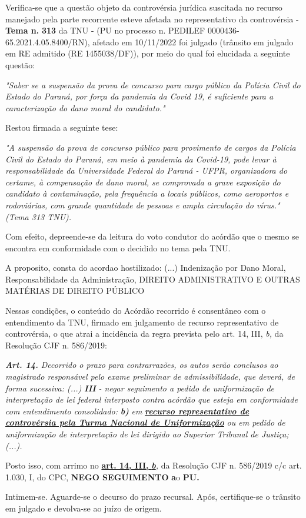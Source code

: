 \documentclass[12pt]{article}
\begin{document}
\justifying
\noindent Verifica-se que a questão objeto da controvérsia jurídica suscitada no recurso manejado pela parte recorrente esteve afetada no representativo da controvérsia - \textbf{Tema n. }\textbf{313} da TNU - (PU no processo n. PEDILEF 0000436-65.2021.4.05.8400/RN),  afetado em 10/11/2022 foi julgado (trânsito em julgado em RE admitido (RE 1455038/DF)), por meio do qual foi elucidada a seguinte questão:

\noindent \textit{"Saber se a suspensão da prova de concurso para cargo público da Polícia Civil do Estado do Paraná, por força da pandemia da Covid 19, é suficiente para a caracterização do dano moral do candidato."}

\noindent Restou firmada a seguinte tese:

\noindent \textit{"A suspensão da prova de concurso público para provimento de cargos da Polícia Civil do Estado do Paraná, em meio à pandemia da Covid-19, pode levar à responsabilidade da Universidade Federal do Paraná - UFPR, organizadora do certame, à compensação de dano moral, se comprovada a grave exposição do candidato à contaminação, pela frequência a locais públicos, como aeroportos e rodoviárias, com grande quantidade de pessoas e ampla circulação do vírus." (Tema 313 TNU).}

\noindent Com efeito, depreende-se da leitura do voto condutor do acórdão que o mesmo se encontra em conformidade com o decidido no  tema pela TNU.

\noindent A proposito, consta do acordao hostilizado: (...) Indenização por Dano Moral, Responsabilidade da Administração, DIREITO ADMINISTRATIVO E OUTRAS MATÉRIAS DE DIREITO PÚBLICO

\noindent Nessas condições, o conteúdo do Acórdão recorrido é consentâneo com o entendimento da TNU, firmado em julgamento de recurso representativo de controvérsia, o que atrai a incidência da regra prevista pelo art. 14, III, \textit{b,} da Resolução CJF n. 586/2019:

\noindent \textit{\textbf{Art. 14.}}\textit{ Decorrido o prazo para contrarrazões, os autos serão conclusos ao magistrado responsável pelo exame preliminar de admissibilidade, que deverá, de forma sucessiva: (...) }\textit{\textbf{III }}\textit{- negar seguimento a pedido de uniformização de interpretação de lei federal interposto contra acórdão que esteja em conformidade com entendimento consolidado: }\textit{\textbf{b)}}\textit{ em }\uline{\textit{\textbf{recurso representativo de controvérsia pela Turma Nacional de Uniformização}}}\textit{ ou em pedido de uniformização de interpretação de lei dirigido ao Superior Tribunal de Justiça;(...).}

\noindent Posto isso, com arrimo no \uline{\textbf{art. 14, III, }}\uline{\textit{\textbf{b}}}\textit{,} da Resolução CJF n. 586/2019 c/c art. 1.030, I, do CPC, \textbf{NEGO SEGUIMENTO }\textbf{a}o\textbf{ PU}\textbf{.}

\noindent Intimem-se. Aguarde-se o decurso do prazo recursal. Após, certifique-se o trânsito em julgado e devolva-se ao juízo de origem.
\end{document}
